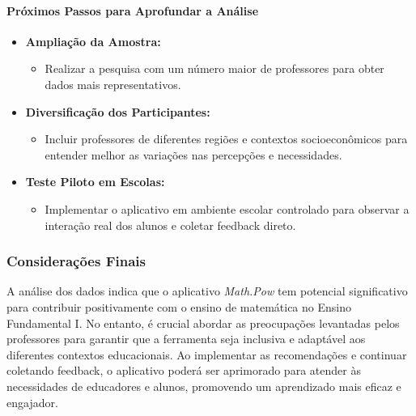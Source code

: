\paragraph{Próximos Passos para Aprofundar a Análise}

\begin{itemize}
    \item \textbf{Ampliação da Amostra:}
    \begin{itemize}
        \item Realizar a pesquisa com um número maior de professores para obter dados mais representativos.
    \end{itemize}
    \item \textbf{Diversificação dos Participantes:}
    \begin{itemize}
        \item Incluir professores de diferentes regiões e contextos socioeconômicos para entender melhor as variações nas percepções e necessidades.
    \end{itemize}
    \item \textbf{Teste Piloto em Escolas:}
    \begin{itemize}
        \item Implementar o aplicativo em ambiente escolar controlado para observar a interação real dos alunos e coletar feedback direto.
    \end{itemize}
\end{itemize}

\subsubsection{Considerações Finais}

A análise dos dados indica que o aplicativo \textit{Math.Pow} tem potencial significativo para contribuir positivamente com o ensino de matemática no Ensino Fundamental I. No entanto, é crucial abordar as preocupações levantadas pelos professores para garantir que a ferramenta seja inclusiva e adaptável aos diferentes contextos educacionais. Ao implementar as recomendações e continuar coletando feedback, o aplicativo poderá ser aprimorado para atender às necessidades de educadores e alunos, promovendo um aprendizado mais eficaz e engajador.
